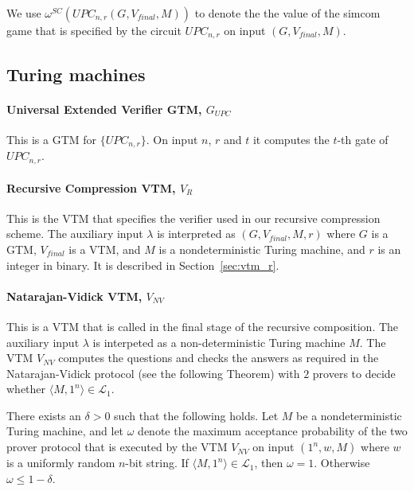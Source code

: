 We use $\omega^{SC}(UPC_{n,r}(G,V_{final},M))$ to denote the the value of the simcom game that is specified by the circuit $UPC_{n,r}$ on input $(G,V_{final},M)$.

\subsection{Turing machines}

\paragraph{Universal Extended Verifier GTM, $G_{UPC}$} This is a GTM for $\{UPC_{n,r}\}$. On input $n$, $r$ and $t$ it computes the $t$-th gate of $UPC_{n,r}$. 

\paragraph{Recursive Compression VTM, $V_R$} This is the VTM that specifies the verifier used in our recursive compression scheme. The auxiliary input $\lambda$ is interpreted as $(G,V_{final},M,r)$ where $G$ is a GTM, $V_{final}$ is a VTM, and $M$ is a nondeterministic Turing machine, and $r$ is an integer in binary. It is described in Section~\ref{sec:vtm_r}. 

\paragraph{Natarajan-Vidick VTM, $V_{NV}$} This is a VTM that is called in the final stage of the recursive composition. The auxiliary input $\lambda$ is interpeted as a non-deterministic Turing machine $M$. The VTM $V_{NV}$ computes the questions and checks the answers as required in the Natarajan-Vidick protocol (see the following Theorem) with $2$ provers to decide whether $\langle M, 1^n \rangle \in \mathcal{L}_1$.

\begin{theorem}\label{thm:nv}
There exists an $\delta > 0$ such that the following holds. Let $M$ be a nondeterministic Turing machine, and let $\omega$ denote the maximum acceptance probability of the two prover protocol that is executed by the VTM $V_{NV}$ on input $(1^n,w,M)$ where $w$ is a uniformly random $n$-bit string. If $\langle M, 1^n \rangle \in \mathcal{L}_1$, then $\omega = 1$. Otherwise $\omega \leq 1 - \delta$. 
\end{theorem}


